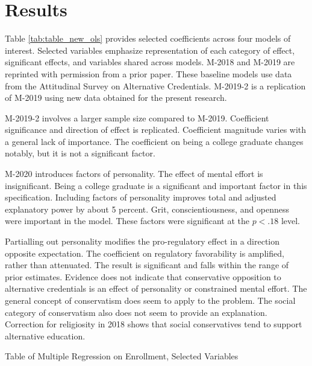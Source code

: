 \documentclass[review]{elsarticle}
\begin{document}
\section{Results}

Table \ref{tab:table_new_ols} provides selected coefficients across four models of interest.
Selected variables emphasize representation of each category of effect,
significant effects,
and variables shared across models.
M-2018 and M-2019 are reprinted with permission from a prior paper.
These baseline models use data from the Attitudinal Survey on Alternative Credentials\cite{vandivier2020preliminary}.
M-2019-2 is a replication of M-2019 using new data obtained for the present research.

M-2019-2 involves a larger sample size compared to M-2019.
Coefficient significance and direction of effect is replicated.
Coefficient magnitude varies with a general lack of importance.
The coefficient on being a college graduate changes notably, but it is not a significant factor.

M-2020 introduces factors of personality.
The effect of mental effort is insignificant.
Being a college graduate is a significant and important factor in this specification.
Including factors of personality improves total and adjusted explanatory power by about 5 percent.
Grit, conscientiousness, and openness were important in the model.
These factors were significant at the $p<.18$ level.

Partialling out personality modifies the pro-regulatory effect in a direction opposite expectation.
The coefficient on regulatory favorability is amplified, rather than attenuated.
The result is significant and falls within the range of prior estimates.
Evidence does not indicate that conservative opposition to alternative credentials is an effect of personality or constrained mental effort.
The general concept of conservatism does seem to apply to the problem.
The social category of conservatism also does not seem to provide an explanation.
Correction for religiosity in 2018 shows that social conservatives tend to support alternative education.

\begin{table}
    \caption{Table of Multiple Regression on Enrollment, Selected Variables}
    \resizebox{\columnwidth}{!}{
        
    }
    \label{tab:table_new_ols}
\end{table}
\end{document}
